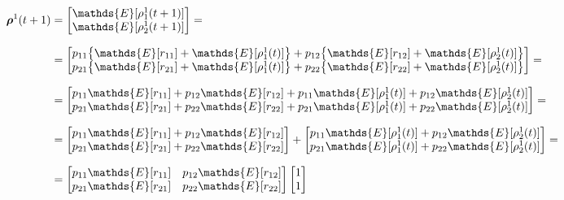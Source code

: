 \documentclass[\main/main.tex]{subfiles}
\begin{document}
\begin{equation}
\setlength{\jot}{10pt}
\begin{split}
    \bm{\rho}^1(t+1) &=       
\begin{bmatrix}
      \mathds{E}[\rho_1^1(t+1)]\\
      \mathds{E}[\rho_2^1(t+1)]\\
\end{bmatrix}= \\
  &= 
 \begin{bmatrix} 
 p_{11} \big\{ \mathds{E}[r_{11}]  + \mathds{E}[\rho_1^1(t)]\big\} + p_{12}\big\{ \mathds{E}[r_{12}]  + \mathds{E}[\rho_2^1(t)]\big\}\\
  p_{21} \big\{ \mathds{E}[r_{21}]  + \mathds{E}[\rho_1^1(t)]\big\} + p_{22}\big\{ \mathds{E}[r_{22}]  + \mathds{E}[\rho_2^1(t)]\big\} \\
 \end{bmatrix} =\\
  &=  
 \begin{bmatrix} 
 p_{11}\mathds{E}[r_{11}]  +  p_{12}\mathds{E}[r_{12}] + p_{11}\mathds{E}[\rho_1^1(t)] + p_{12}\mathds{E}[\rho_2^1(t)]\\
 p_{21}\mathds{E}[r_{21}] + 
 p_{22} \mathds{E}[r_{22}] + p_{21}\mathds{E}[\rho_1^1(t)] + 
 p_{22}\mathds{E}[\rho_2^1(t)]\\
 \end{bmatrix} =\\
  &=  
 \begin{bmatrix} 
 p_{11}\mathds{E}[r_{11}]  +  p_{12}\mathds{E}[r_{12}]\\
 p_{21}\mathds{E}[r_{21}] + 
 p_{22} \mathds{E}[r_{22}]\\
 \end{bmatrix}
 + 
 \begin{bmatrix} 
 p_{11}\mathds{E}[\rho_1^1(t)] + p_{12}\mathds{E}[\rho_2^1(t)] \\
 p_{21}\mathds{E}[\rho_1^1(t)] + 
 p_{22}\mathds{E}[\rho_2^1(t)]\\
 \end{bmatrix} =\\
  &= 
 \begin{bmatrix} 
 p_{11}\mathds{E}[r_{11}] & p_{12}\mathds{E}[r_{12}]\\
 p_{21}\mathds{E}[r_{21}] & 
 p_{22} \mathds{E}[r_{22}]\\
 \end{bmatrix}
  \begin{bmatrix}
 1\\
 1\\

\end{bmatrix}
\end{split}
\end{equation}
\end{document}
